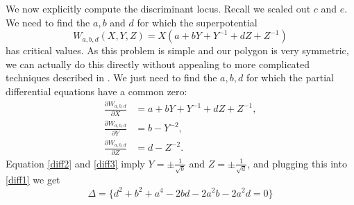 \documentclass[oneside]{amsart}
\theoremstyle{definition}
\theoremstyle{definition}
\theoremstyle{definition}
\theoremstyle{definition}
\newcommand{\Fs}{\mathcal{F}}
\begin{document}

We now explicitly compute the discriminant locus. Recall we scaled out $c$ and $e$. We need to find the $a, b$ and $d$ for which the superpotential
$$
W_{a,b,d}(X,Y,Z) = X(a + bY + Y^{-1} +dZ + Z^{-1})
$$
has critical values. As this problem is simple and our polygon is very symmetric, we can actually do this directly without appealing to more complicated techniques described in \cite{gelfand1994discriminants}. We just need to find the $a,b,d$ for which the partial differential equations have a common zero:
\begin{align}
    \frac{\partial W_{a,b,d}}{\partial X} &= a + bY + Y^{-1} +dZ + Z^{-1}, 
    \label{diff1} \\
    \frac{\partial W_{a,b,d}}{\partial Y} &= b-Y^{-2}, 
    \label{diff2}\\
    \frac{\partial W_{a,b,d}}{\partial Z} &= d - Z^{-2}.
    \label{diff3}
\end{align}
Equation \ref{diff2} and \ref{diff3} imply $Y = \pm \frac{1}{\sqrt{b}}$ and $Z = \pm \frac{1}{\sqrt{d}}$, and plugging this into \ref{diff1} we get
\begin{equation}
    \label{discrimexmp1}
    \Delta = \{d^2 + b^2 + a^4 -2bd - 2a^2b - 2a^2d = 0\}
\end{equation}
\end{document}
